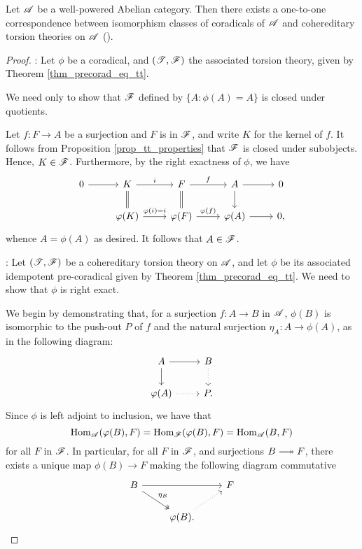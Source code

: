 \begin{thm}\label{thm_corad_equiv_htt}
Let $\mathscr{A}$ be a well-powered Abelian category. Then there 
exists a one-to-one correspondence between isomorphism classes of coradicals of $\mathscr{A}$ 
and cohereditary torsion theories on $\mathscr{A}$ (\CF \cite[I2.12]{BJV}).
\end{thm}
\begin{proof}

 : Let 
$\phi$ be a coradical, and $(\mathscr{T}, \mathscr{F})$ the associated
torsion theory, given by Theorem \ref{thm_precorad_eq_tt}.

We need only to show that $\mathscr{F}$ defined by $\{A : \phi(A) = 
A\}$ is closed under quotients.

Let $f: F \to A$ be a surjection and $F$ is in $\mathscr{F}$,
and write $K$ for the kernel of $f$. It follows from Proposition
\ref{prop_tt_properties} that $\mathscr{F}$ is closed under 
subobjects. Hence, $K \in \mathscr{F}$. Furthermore, by the right 
exactness of $\phi$, we have
\[
\begin{tikzcd}
0 \arrow{r} & 
K \arrow{r}{i} \arrow[equals]{d} &
F \arrow{r}{f} \arrow[equals]{d} &
A \arrow{r} \arrow{d} &
0 \\
& \phi(K) \arrow{r}{\phi(i) = i} &
\phi(F) \arrow{r}{\phi(f)} &
\phi(A) \arrow{r} &
0,
\end{tikzcd}
\]
whence $A = \phi(A)$ as desired. It follows that $A \in \mathscr{F}$.

 : Let
$(\mathscr{T}, \mathscr{F})$ be a cohereditary torsion theory on $\mathscr{A}$,
and let $\phi$ be its associated idempotent pre-coradical given by 
Theorem \ref{thm_precorad_eq_tt}. We need to show that $\phi$ is right 
exact.

We begin by demonstrating that, for a surjection $f: A \to B$ in 
$\mathscr{A}$, $\phi(B)$ is isomorphic to the push-out $P$ of
$f$ and the natural surjection $\eta_A: A \to \phi(A)$, as in the
following diagram:
\[
\begin{tikzcd}
A \arrow{r} \arrow{d} & B \arrow[dotted]{d}\\
\phi(A) \arrow[dotted]{r} & P.
\end{tikzcd}
\]
Since $\phi$ is left adjoint to inclusion, we have that
\[
\mathrm{Hom}_{\mathscr{A}}(\varphi(B), F) = \mathrm{Hom}_{\mathscr{F}}(\varphi(B), F) = 
   \mathrm{Hom}_{\mathscr{A}}(B, F)
\]
for all $F$ in $\mathscr{F}$. In particular, for all $F$ in $\mathscr{F}$, 
and surjections $B \onto F$, there exists a unique map $\phi(B) 
\to F$ making the following diagram commutative
\[
\begin{tikzcd}
B \arrow[twoheadrightarrow]{rd}{\eta_B} \arrow{rr} & & F \\
&\phi(B) \arrow[dotted]{ru}.
\end{tikzcd}
\]


\end{proof}
